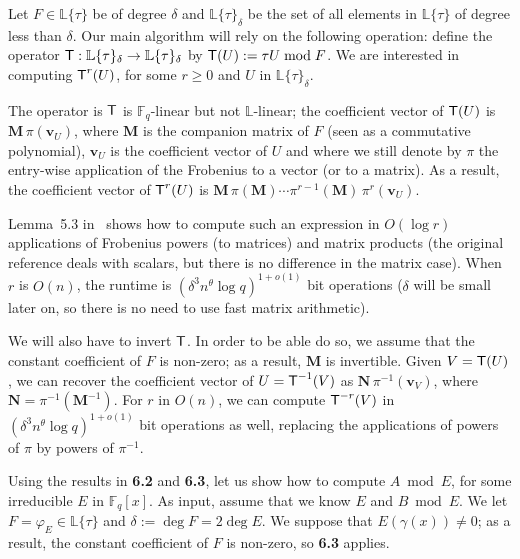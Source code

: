 \documentclass[sigconf]{acmart}
\newcommand{\F}{\mathbb{F}}
\renewcommand{\L}{\mathbb{L}}
\newcommand{\ang}[1]{\{#1\}}
\begin{document}
\smallskip{} Let $F \in\L\ang{\tau}$ be of degree
$\delta$ and $\L\ang{\tau}_{\delta}$ be the set of all elements in
$\L\ang{\tau}$ of degree less than $\delta$. Our main algorithm will
rely on the following operation: define the operator $\text{\sf
  T}:\L\ang{\tau}_{\delta} \to \L\ang{\tau}_{\delta}$ by $\text{\sf
  T}(U) := \tau U \bmod F$.  We are interested in computing $\text{\sf
  T}^r(U)$, for some $r \ge 0$ and $U$ in
$\L\ang{\tau}_{\delta}$.

The operator is $\text{\sf T}$ is $\F_q$-linear but not $\L$-linear;
the coefficient vector of $\text{\sf T}(U)$ is ${\bm M}\, \pi({\bm
  v}_U)$, where ${\bm M}$ is the companion matrix of $F$ (seen as a
commutative polynomial), ${\bm v}_U$ is the coefficient vector of $U$
and where we still denote by $\pi$ the entry-wise application of the
Frobenius to a vector (or to a matrix). As a result, the coefficient
vector of $\text{\sf T}^r(U)$ is ${\bm M}\, \pi({\bm M}) \cdots
\pi^{r-1}({\bm M})\, \pi^r({\bm v}_U)$.

Lemma~5.3 in~\cite{vonzurGathen1992} shows how to compute such an
expression in $O(\log r)$ applications of Frobenius powers (to
matrices) and matrix products (the original reference deals with
scalars, but there is no difference in the matrix case). When $r$ is
$O(n)$, the runtime is $(\delta^3 n^\theta \log q)^{1+o(1)}$ bit
operations ($\delta$ will be small later on, so there is no need
to use fast matrix arithmetic).

\smallskip{} We will also have to invert $\text{\sf
  T}$.  In order to be able do so, we assume that the constant
coefficient of $F$ is non-zero; as a result, ${\bm M}$ is invertible.
Given $V=\text{\sf T}(U)$, we can recover the coefficient vector
of $U=\text{\sf T}^{-1}(V)$ as ${\bm N}\, \pi^{-1}({\bm v}_V)$, where
${\bm N}=\pi^{-1}({\bm M}^{-1})$. For $r$ in $O(n)$, we can compute
$\text{\sf T}^{-r}(V)$ in $(\delta^3 n^\theta \log q)^{1+o(1)}$ bit
operations as well, replacing the applications of powers of $\pi$ by
powers of $\pi^{-1}$.

\smallskip{} Using the results in {\bf 6.2} and {\bf
  6.3}, let us show how to compute $A \bmod E$, for some irreducible
$E$ in $\F_q[x]$. As input, assume that we know $E$ and $B \bmod
E$. We let $F=\varphi_E \in \L\ang{\tau}$ and $\delta := \deg F = 2
\deg E$. We suppose that $E(\gamma(x)) \ne 0$; as a result, the
constant coefficient of $F$ is non-zero, so {\bf 6.3} applies.
\end{document}

